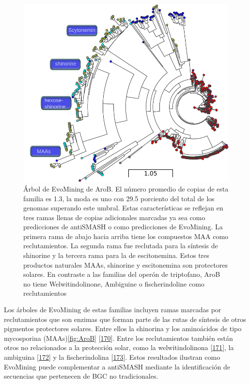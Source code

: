 \documentclass[12pt,twoside]{reedthesis}
\begin{document}
  \begin{figure}[h!tbp]
  \centering
  \includegraphics[angle = 0,scale = .9]{chapter2/AroB.pdf}
  \caption[AroB en Cianobacteria]{\footnotesize{Árbol de EvoMining de AroB. El número promedio de copias de esta familia es 1.3, la moda es uno con 29.5 porciento del total de los genomas superando este umbral. Estas características se reflejan en tres ramas llenas de copias adicionales marcadas ya sea como predicciones de antiSMASH o como predicciones de EvoMining. La primera rama de abajo hacia arriba tiene los compuestos MAA como reclutamientos. La segunda rama fue reclutada para la síntesis de shinorine y la tercera rama para la de escitonemina. Estos tres productos naturales MAAs, shinorine y escitonemina son protectores solares. En contraste a las familias del operón de triptofano, AroB no tiene Welwitindolinone, Ambiguine o fischerindoline como reclutamientos}}
  \label{fig:AroB}
  \end{figure}
  
  Los árboles de EvoMining de estas familias incluyen ramas marcadas por
  reclutamientos que son enzimas que forman parte de las rutas de síntesis
  de otros pigmentos protectores solares. Entre ellos la shinorina y los
  aminoácidos de tipo mycosporina (MAAs)\autoref{fig:AroB}
  {[}\protect\hyperlink{ref-balskus_genetic_2010}{170}{]}. Entre los
  reclutamientos también están otros no relacionados a la protección
  solar, como la welwitindolinona
  {[}\protect\hyperlink{ref-hillwig_identification_2014}{171}{]}, la
  ambiguina
  {[}\protect\hyperlink{ref-li_hapalindole_ambiguine_2015}{172}{]} y la
  fischerindolina {[}\protect\hyperlink{ref-li_decoding_2017}{173}{]}.
  Estos resultados ilustran como EvoMining puede complementar a antiSMASH
  mediante la identificación de secuencias que pertenecen de BGC no
  tradicionales.
  
\end{document}
